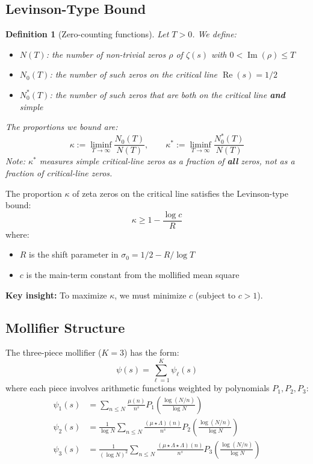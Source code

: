 \documentclass[11pt]{article}
\newtheorem{definition}{Definition}
\begin{document}
\subsection{Levinson-Type Bound}

\begin{definition}[Zero-counting functions]
\label{def:zero-counting}
Let $T > 0$. We define:
\begin{itemize}
\item $N(T)$: the number of non-trivial zeros $\rho$ of $\zeta(s)$ with $0 < \operatorname{Im}(\rho) \leq T$
\item $N_0(T)$: the number of such zeros on the critical line $\operatorname{Re}(s) = 1/2$
\item $N_0^*(T)$: the number of such zeros that are both on the critical line \textbf{and} simple
\end{itemize}
The proportions we bound are:
\[
\kappa := \liminf_{T \to \infty} \frac{N_0(T)}{N(T)}, \qquad
\kappa^* := \liminf_{T \to \infty} \frac{N_0^*(T)}{N(T)}
\]
Note: $\kappa^*$ measures simple critical-line zeros as a fraction of \textbf{all} zeros, not as a fraction of critical-line zeros.
\end{definition}

The proportion $\kappa$ of zeta zeros on the critical line satisfies the Levinson-type bound:
\begin{equation}
\boxed{\kappa \geq 1 - \frac{\log c}{R}}
\end{equation}
where:
\begin{itemize}
\item $R$ is the shift parameter in $\sigma_0 = 1/2 - R/\log T$
\item $c$ is the main-term constant from the mollified mean square
\end{itemize}

\textbf{Key insight:} To maximize $\kappa$, we must minimize $c$ (subject to $c > 1$).

\subsection{Mollifier Structure}

The three-piece mollifier ($K=3$) has the form:
\begin{equation}
\psi(s) = \sum_{\ell=1}^{K} \psi_\ell(s)
\end{equation}
where each piece involves arithmetic functions weighted by polynomials $P_1, P_2, P_3$:
\begin{align}
\psi_1(s) &= \sum_{n \leq N} \frac{\mu(n)}{n^s} P_1\left(\frac{\log(N/n)}{\log N}\right) \\
\psi_2(s) &= \frac{1}{\log N} \sum_{n \leq N} \frac{(\mu \star \Lambda)(n)}{n^s} P_2\left(\frac{\log(N/n)}{\log N}\right) \\
\psi_3(s) &= \frac{1}{(\log N)^2} \sum_{n \leq N} \frac{(\mu \star \Lambda \star \Lambda)(n)}{n^s} P_3\left(\frac{\log(N/n)}{\log N}\right)
\end{align}
\end{document}

